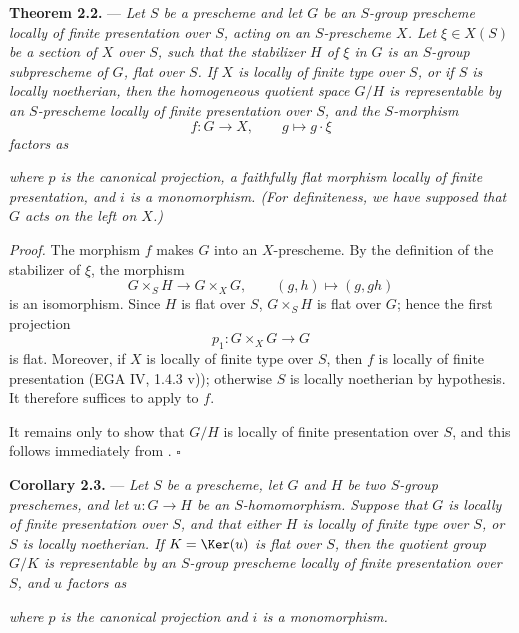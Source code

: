 \noindent{}%
\textbf{Theorem 2.2.} --- \textit{Let \(S\) be a prescheme and let
\(G\) be an \(S\)-group prescheme locally of finite presentation
over \(S\), acting on an \(S\)-prescheme \(X\). Let
\(\xi\in X(S)\) be a section of \(X\) over \(S\), such that the
stabilizer \(H\) of \(\xi\) in \(G\) is an \(S\)-group
subprescheme of \(G\), flat over \(S\). If \(X\) is locally of
finite type over \(S\), or if \(S\) is locally noetherian, then the
homogeneous quotient space \(G/H\) is representable by an
\(S\)-prescheme locally of finite presentation over \(S\), and the
\(S\)-morphism}
\[
  f:G\longrightarrow X,\qquad g\longmapsto g\cdot\xi
\]
\textit{factors as}
\begin{center}
  
\end{center}
\textit{where \(p\) is the canonical projection, a faithfully flat
morphism locally of finite presentation, and \(i\) is a
monomorphism. (For definiteness, we have supposed that \(G\) acts
on the left on \(X\).)}

\medskip
\noindent\textit{Proof.}
The morphism \(f\) makes \(G\) into an \(X\)-prescheme. By the
definition of the stabilizer of \(\xi\), the morphism
\[
  G\times_S H\longrightarrow G\times_X G,\qquad
  (g,h)\longmapsto(g,gh)
\]
is an isomorphism. Since \(H\) is flat over \(S\),
\(G\times_S H\) is flat over \(G\); hence the first projection
\[
  p_1:G\times_X G\longrightarrow G
\]
is flat. Moreover, if \(X\) is locally of finite type over \(S\),
then \(f\) is locally of finite presentation (EGA IV, 1.4.3 v));
otherwise \(S\) is locally noetherian by hypothesis. It therefore
suffices to apply  to \(f\).

It remains only to show that \(G/H\) is locally of finite
presentation over \(S\), and this follows immediately from
.
\hfill\(\square\)

\medskip
\noindent{}%
\textbf{Corollary 2.3.} --- \textit{Let \(S\) be a prescheme, let
\(G\) and \(H\) be two \(S\)-group preschemes, and let
\(u:G\to H\) be an \(S\)-homomorphism. Suppose that \(G\) is locally
of finite presentation over \(S\), and that either \(H\) is locally
of finite type over \(S\), or \(S\) is locally noetherian. If
\(K=\Ker(u)\) is flat over \(S\), then the quotient group \(G/K\)
is representable by an \(S\)-group prescheme locally of finite
presentation over \(S\), and \(u\) factors as}
\begin{center}
  
\end{center}
\textit{where \(p\) is the canonical projection and \(i\) is a
monomorphism.}

